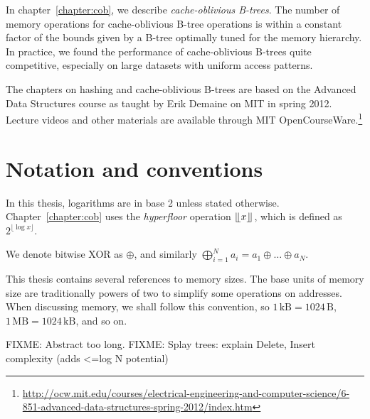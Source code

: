 In chapter~\ref{chapter:cob}, we describe \emph{cache-oblivious B-trees}.
The number of memory operations for cache-oblivious B-tree operations
is within a constant factor of the bounds given by a B-tree optimally tuned
for the memory hierarchy. In practice, we found the performance of
cache-oblivious B-trees quite competitive, especially on large datasets
with uniform access patterns.

The chapters on hashing and cache-oblivious B-trees are based on the Advanced
Data Structures course as taught by Erik Demaine on MIT in spring 2012.
Lecture videos and other materials are available through MIT OpenCourseWare.\footnote{%
\url{http://ocw.mit.edu/courses/electrical-engineering-and-computer-science/6-851-advanced-data-structures-spring-2012/index.htm}}

\section*{Notation and conventions}
In this thesis, logarithms are in base 2 unless stated otherwise.
Chapter~\ref{chapter:cob} uses the \emph{hyperfloor} operation
$\lfloor \kern -0.22em \lfloor x\rfloor \kern -0.22em \rfloor$, which is defined as $2^{\lfloor\log x\rfloor}$.

We denote bitwise XOR as $\oplus$, and similarly $\bigoplus_{i=1}^N
a_i=a_1\oplus\ldots\oplus a_N$.

This thesis contains several references to memory sizes. The base units of
memory size are traditionally powers of two to simplify some operations on
addresses.
When discussing memory, we shall follow this convention, so
$1\,\mathrm{kB}=1024\,\mathrm{B}$, $1\,\mathrm{MB}=1024\,\mathrm{kB}$,
and so on.

FIXME: Abstract too long.
FIXME: Splay trees: explain Delete, Insert complexity (adds <=log N potential)
